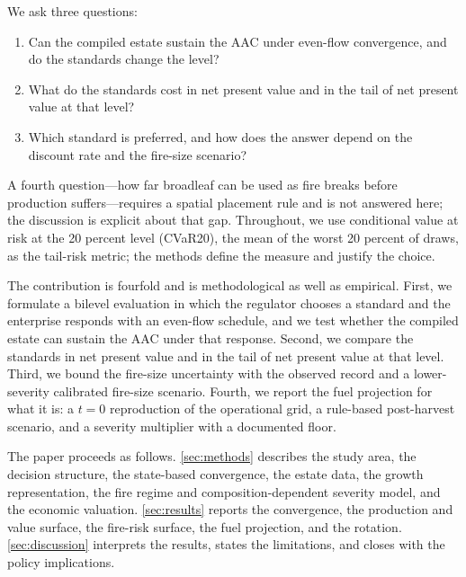 We ask three questions:

\begin{enumerate}
    \item[\textit{RQ1}] Can the compiled estate sustain the AAC under even-flow convergence, and do
    the standards change the level?
    \item[\textit{RQ2}] What do the standards cost in net present value and in the tail of net
    present value at that level?
    \item[\textit{RQ3}] Which standard is preferred, and how does the answer depend on the discount
    rate and the fire-size scenario?
\end{enumerate}

A fourth question---how far broadleaf can be used as fire breaks before production suffers---requires
a spatial placement rule and is not answered here; the discussion is explicit about that gap.
Throughout, we use conditional value at risk at the 20 percent level (CVaR20), the mean of the
worst 20 percent of draws, as the tail-risk metric; the methods define the measure and justify the
choice.

The contribution is fourfold and is methodological as well as empirical. First, we formulate a bilevel evaluation in which the regulator chooses a
standard and the enterprise responds with an even-flow schedule, and we test whether the compiled
estate can sustain the AAC under that response. Second, we compare the standards
in net present value and in the tail of net present value at that level. Third, we bound the
fire-size uncertainty with the observed record and a lower-severity calibrated fire-size scenario. Fourth, we report
the fuel projection for what it is: a $t=0$ reproduction of the operational grid, a rule-based
post-harvest scenario, and a severity multiplier with a documented floor.

The paper proceeds as follows. \autoref{sec:methods} describes the study area, the decision
structure, the state-based convergence, the estate data, the growth representation, the fire regime
and composition-dependent severity model, and the economic valuation. \autoref{sec:results} reports
the convergence, the production and value surface, the fire-risk surface, the fuel projection, and
the rotation. \autoref{sec:discussion} interprets the results, states the limitations, and closes
with the policy implications.
